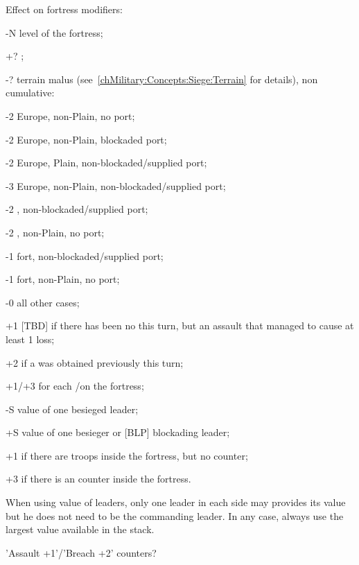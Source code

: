 Effect on fortress modifiers:
\begin{modlist}
\item[-N] level of the fortress;
\item[+?] ;
\item[-?] terrain malus (see~\ref{chMilitary:Concepts:Siege:Terrain} for
  details), non cumulative:
  \begin{modlisti}
  \item[-2] Europe, non-Plain, no port;
  \item[-2] Europe, non-Plain, blockaded port;
  \item[-2] Europe, Plain, non-blockaded/supplied port;
  \item[-3] Europe, non-Plain, non-blockaded/supplied port;
  \item[-2] \ROTW, non-blockaded/supplied port;
  \item[-2] \ROTW, non-Plain, no port;
  \item[-1] fort, non-blockaded/supplied port;
  \item[-1] fort, non-Plain, no port;
  \item[-0] all other cases;
  \end{modlisti}
\item[+1] [TBD] if there has been no  this turn, but an assault
  that managed to cause at least 1 loss; %
\item[+2] if a  was obtained previously this turn;
\item[+1/+3] for each \USURE\facemoins/\faceplus on the fortress;
\item[-S]  value of one besieged leader;
\item[+S]  value of one besieger or [BLP] blockading leader;
\item[+1] if there are troops inside the fortress, but no \ARMY counter;
\item[+3] if there is an \ARMY counter inside the fortress.
\end{modlist}

When using  value of leaders, only one leader in each side may
provides its value but he does not need to be the commanding leader. In any
case, always use the largest  value available in the stack.

\begin{todo}
  'Assault +1'/'Breach +2' counters?
\end{todo}

